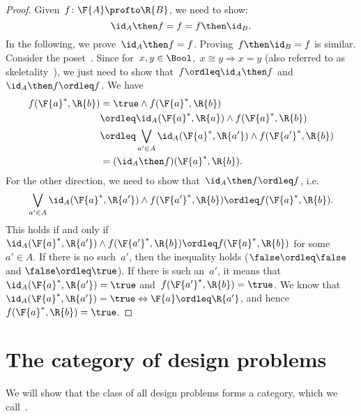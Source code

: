 \begin{proof}
    Given~$f\colon \F{A}\profto \R{B}$, we need to show:
    \begin{equation*}
        \id_A \then f= f = f\then \id_B.
    \end{equation*}
    In the following, we prove~$\id_A \then f = f$. Proving~$f\then \id_B=f$ is similar.
    Consider the poset~\Bool. Since for~$x,y\in \Bool$,~$x\cong y \Rightarrow x=y$ (also referred to as skeletality~\cite{fong2019}), we just need to show that~$f\ordleq \id_A\then f$ and~$\id_A\then f\ordleq f$.
    We have
    \begin{equation*}
        \begin{aligned}
            f(\F{a}^*,\R{b})&=\true \wedge f(\F{a}^*,\R{b})\\
            &\ordleq \id_A(\F{a}^*,\R{a}) \wedge f(\F{a}^*,\R{b})\\
            &\ordleq \bigvee_{a'\in A}\id_A(\F{a}^*,\R{a'})\wedge f(\F{a'}^*,\R{b})\\
            &=(\id_A\then f)(\F{a}^*,\R{b}).
        \end{aligned}
    \end{equation*}
    For the other direction, we need to show that~$\id_A\then f\ordleq f$, i.e.
    \begin{equation*}
        \bigvee_{a'\in A}\id_A(\F{a}^*,\R{a'})\wedge f(\F{a'}^*,\R{b}) \ordleq f(\F{a}^*,\R{b}).
    \end{equation*}
    This holds if and only if~$\id_A(\F{a}^*,\R{a'})\wedge f(\F{a'}^*,\R{b}) \ordleq f(\F{a}^*,\R{b})$ for some~$a'\in A$. If there is no such~$a'$, then the inequality holds ($\false \ordleq \false$ and $\false \ordleq \true$). If there is such an~$a'$, it means that~$\id_A(\F{a}^*,\R{a'})=\true$ and~$f(\F{a'}^*,\R{b})=\true$. We know that~$\id_A(\F{a}^*,\R{a'})=\true \Leftrightarrow \F{a}\ordleq \R{a'}$, and hence~$f(\F{a}^*,\R{b})=\true$.
\end{proof}


\section{The category of design problems}

We will show that the class of all design problems forms a category, which we call~\iindex{\DP}.

